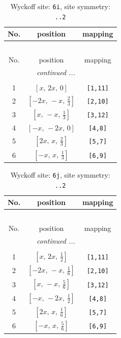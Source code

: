 \documentclass[fleqn,8pt]{jsarticle}
\begin{document}
\renewcommand{\arraystretch}{1.2}
\begin{longtable}{ccc}
\caption{Wyckoff site: {\tt 6i}, site symmetry: {\tt ..2}}
 \\
 \hline \hline
No. & position & mapping \\ \hline \endfirsthead

\multicolumn{2}{l}{\tablename\ \thetable{}} \\
 \hline \hline
No. & position & mapping \\ \hline \endhead

 \hline \hline
\multicolumn{2}{r}{\footnotesize\it continued ...} \\ \endfoot

 \hline \hline
\multicolumn{2}{r}{} \\ \endlastfoot

1 & $\left[ x,\, 2 x,\, 0 \right]$ & {\tt [1,11]} \\ \hline
2 & $\left[ - 2 x,\, - x,\, \frac{2}{3} \right]$ & {\tt [2,10]} \\ \hline
3 & $\left[ x,\, - x,\, \frac{1}{3} \right]$ & {\tt [3,12]} \\ \hline
4 & $\left[ - x,\, - 2 x,\, 0 \right]$ & {\tt [4,8]} \\ \hline
5 & $\left[ 2 x,\, x,\, \frac{2}{3} \right]$ & {\tt [5,7]} \\ \hline
6 & $\left[ - x,\, x,\, \frac{1}{3} \right]$ & {\tt [6,9]} \\
\end{longtable}
\renewcommand{\arraystretch}{1.2}
\begin{longtable}{ccc}
\caption{Wyckoff site: {\tt 6j}, site symmetry: {\tt ..2}}
 \\
 \hline \hline
No. & position & mapping \\ \hline \endfirsthead

\multicolumn{2}{l}{\tablename\ \thetable{}} \\
 \hline \hline
No. & position & mapping \\ \hline \endhead

 \hline \hline
\multicolumn{2}{r}{\footnotesize\it continued ...} \\ \endfoot

 \hline \hline
\multicolumn{2}{r}{} \\ \endlastfoot

1 & $\left[ x,\, 2 x,\, \frac{1}{2} \right]$ & {\tt [1,11]} \\ \hline
2 & $\left[ - 2 x,\, - x,\, \frac{1}{6} \right]$ & {\tt [2,10]} \\ \hline
3 & $\left[ x,\, - x,\, \frac{5}{6} \right]$ & {\tt [3,12]} \\ \hline
4 & $\left[ - x,\, - 2 x,\, \frac{1}{2} \right]$ & {\tt [4,8]} \\ \hline
5 & $\left[ 2 x,\, x,\, \frac{1}{6} \right]$ & {\tt [5,7]} \\ \hline
6 & $\left[ - x,\, x,\, \frac{5}{6} \right]$ & {\tt [6,9]} \\
\end{longtable}
\end{document}
